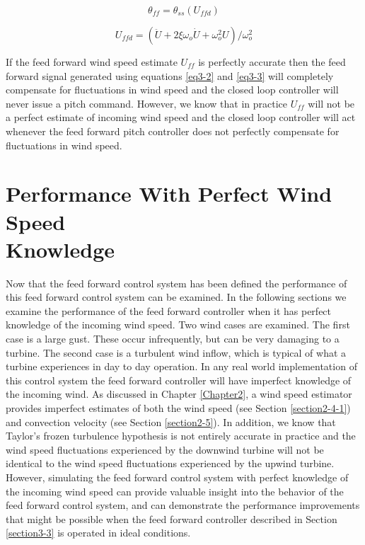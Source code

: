 \begin{equation}
	\theta_{ff} =  \theta_{ss}(U_{ffd}) \label{eq3-2}
\end{equation}

\begin{equation}
	U_{ffd} =  (\ddot{U} + 2 \xi \omega_o \dot{U} + \omega_o^2 U) / \omega_o^2 \label{eq3-3}
\end{equation}

If the feed forward wind speed estimate $U_{ff}$ is perfectly accurate then the feed forward signal generated using equations \ref{eq3-2} and \ref{eq3-3} will completely compensate for fluctuations in wind speed and the closed loop controller will never issue a pitch command. However, we know that in practice $U_{ff}$ will not be a perfect estimate of incoming wind speed and the closed loop controller will act whenever the feed forward pitch controller does not perfectly compensate for fluctuations in wind speed.

\section{Performance With Perfect Wind Speed \\
		Knowledge} \label{section3-4}

Now that the feed forward control system has been defined the performance of this feed forward control system can be examined. In the following sections we examine the performance of the feed forward controller when it has perfect knowledge of the incoming wind speed. Two wind cases are examined. The first case is a large gust. These occur infrequently, but can be very damaging to a turbine. The second case is a turbulent wind inflow, which is typical of what a turbine experiences in day to day operation. In any real world implementation of this control system the feed forward controller will have imperfect knowledge of the incoming wind. As discussed in Chapter \ref{Chapter2}, a wind speed estimator provides imperfect estimates of both the wind speed (see Section  \ref{section2-4-1}) and convection velocity (see Section \ref{section2-5}). In addition, we know that Taylor's frozen turbulence hypothesis is not entirely accurate in practice and the wind speed fluctuations experienced by the downwind turbine will not be identical to the wind speed fluctuations experienced by the upwind turbine. However, simulating the feed forward control system with perfect knowledge of the incoming wind speed can provide valuable insight into the behavior of the feed forward control system, and can demonstrate the performance improvements that might be possible when the feed forward controller described in Section \ref{section3-3} is operated in ideal conditions. 



